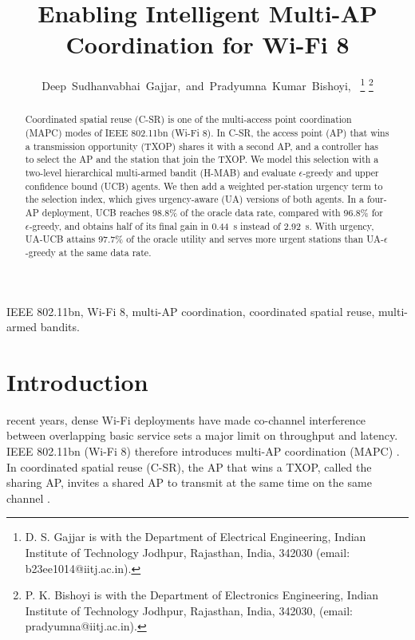 \documentclass[journal]{IEEEtran}
\theoremstyle{definition}
\theoremstyle{remark}
\theoremstyle{plain}
\begin{document}
\title{Enabling Intelligent Multi-AP Coordination for Wi-Fi 8}

\author{Deep~Sudhanvabhai~Gajjar,~and~Pradyumna~Kumar~Bishoyi,~
	\thanks{D. S. Gajjar is with the Department of Electrical Engineering, Indian Institute of Technology Jodhpur, Rajasthan, India, 342030 (email: b23ee1014@iitj.ac.in).}
	\thanks{P. K. Bishoyi is with the Department of Electronics Engineering, Indian Institute of Technology Jodhpur, Rajasthan, India, 342030, (email: pradyumna@iitj.ac.in).}
}

\maketitle

\begin{abstract}
Coordinated spatial reuse (C-SR) is one of the multi-access point coordination (MAPC) modes of IEEE 802.11bn (Wi-Fi 8). In C-SR, the access point (AP) that wins a transmission opportunity (TXOP) shares it with a second AP, and a controller has to select the AP and the station that join the TXOP. We model this selection with a two-level hierarchical multi-armed bandit (H-MAB) and evaluate $\epsilon$-greedy and upper confidence bound (UCB) agents. We then add a weighted per-station urgency term to the selection index, which gives urgency-aware (UA) versions of both agents. In a four-AP deployment, UCB reaches 98.8\% of the oracle data rate, compared with 96.8\% for $\epsilon$-greedy, and obtains half of its final gain in 0.44~s instead of 2.92~s. With urgency, UA-UCB attains 97.7\% of the oracle utility and serves more urgent stations than UA-$\epsilon$-greedy at the same data rate.
\end{abstract}

\begin{IEEEkeywords}
IEEE 802.11bn, Wi-Fi 8, multi-AP coordination, coordinated spatial reuse, multi-armed bandits.
\end{IEEEkeywords}

\IEEEpeerreviewmaketitle
\section{Introduction}
 recent years, dense Wi-Fi deployments have made co-channel interference between overlapping basic service sets a major limit on throughput and latency. IEEE 802.11bn (Wi-Fi 8) therefore introduces multi-AP coordination (MAPC) \cite{galati2024wifi8,yu2024spec}. In coordinated spatial reuse (C-SR), the AP that wins a TXOP, called the sharing AP, invites a shared AP to transmit at the same time on the same channel \cite{nunez2022txop,wojnar2025hmab}.
\end{document}
